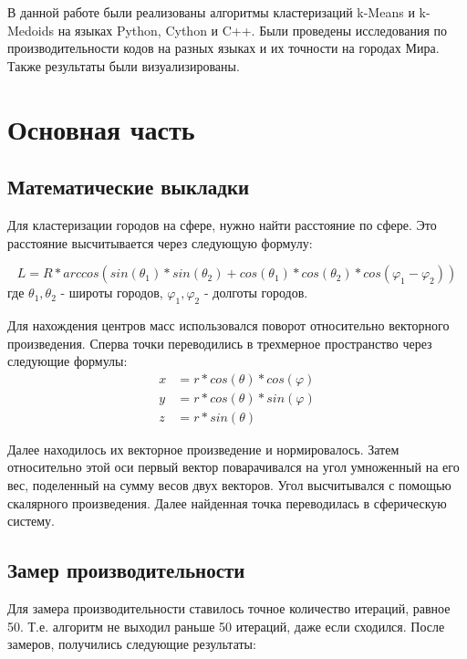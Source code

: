 \documentclass[12pt, a4paper]{article}
\begin{document}
		В данной работе были реализованы алгоритмы кластеризаций k-Means и k-Medoids на языках Python, Cython и C++. Были проведены исследования по производительности кодов на разных языках и их точности на городах Мира. Также результаты были визуализированы.

	\newpage
	\section{Основная часть}
		\subsection{Математические выкладки}
			Для кластеризации городов на сфере, нужно найти расстояние по сфере. Это расстояние высчитывается через следующую формулу:

			$$L = R * arccos(sin(\theta_1) * sin(\theta_2) + cos(\theta_1) * cos(\theta_2) * cos(\varphi_1 - \varphi_2))$$
			где $\theta_1, \theta_2$ - широты городов, $\varphi_1, \varphi_2$ - долготы городов.

			Для нахождения центров масс использовался поворот относительно векторного произведения. Сперва точки переводились в трехмерное пространство через следующие формулы:
			\begin{align*}
			x &= r * cos(\theta) * cos(\varphi) \\
			y &= r * cos(\theta) * sin(\varphi) \\
			z &= r * sin(\theta)
			\end{align*}

			Далее находилось их векторное произведение и нормировалось. Затем относительно этой оси первый вектор поварачивался на угол умноженный на его вес, поделенный на сумму весов двух векторов. Угол высчитывался с помощью скалярного произведения. Далее найденная точка переводилась в сферическую систему.
			

		\newpage
		\subsection{Замер производительности}
		\label{sssec:comp}
			Для замера производительности ставилось точное количество итераций, равное 50. Т.е. алгоритм не выходил раньше 50 итераций, даже если сходился. После замеров, получились следующие результаты:
\end{document}

